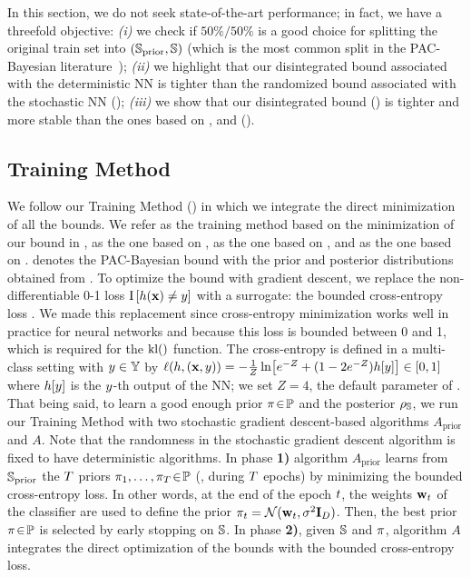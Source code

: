 In this section, we do not seek state-of-the-art performance; in fact, we have a threefold objective:
{\it (i)} we check if $50\%/50\%$ is a good choice for splitting the original train set into $(\S_{\text{prior}}, \S)$ (which is the most common split in the PAC-Bayesian literature~\citep{GermainLacasseLavioletteMarchand2009,PerezOrtizRivasplataShaweTaylorSzepesvari2021});
{\it (ii)} we highlight that our disintegrated bound associated with the deterministic NN is tighter than the randomized bound associated with the stochastic NN ();
{\it (iii)} we show that our disintegrated bound () is tighter and more stable than the ones based on \citet{RivasplataKuzborskijSzepesvariShaweTaylor2020}, \citet{BlanchardFleuret2007} and \citet{Catoni2007} ().

\subsection{Training Method}
We follow our Training Method () in which we integrate the direct minimization of all the bounds.
We refer as \algoours the training method based on the minimization of our bound in , as \algorivasplata the one based on , as \algoblanchard the one based on , and as \algocatoni the one based on .
\algostoNN denotes the PAC-Bayesian bound with the prior and posterior distributions obtained from \algoours.
To optimize the bound with gradient descent, we replace the non-differentiable 0-1 loss $\indic\LB \h(\x)\ne\y\RB$ with a surrogate: the bounded cross-entropy loss \citep{DziugaiteRoy2018}.
We made this replacement since cross-entropy minimization works well in practice for neural networks \citep{GoodfellowBengioCourville2016} and because this loss is bounded between 0 and 1, which is required for the $\kl()$ function.
The cross-entropy is defined in a multi-class setting with \mbox{$\y\in\Y$} by \mbox{$\loss(\h, (\x,\y)) = -\frac{1}{Z}\ln\!\LB e^{-Z}+(1-2e^{-Z})\h[y]\RB \in [0, 1]$} where $\h[y]$ is the \mbox{$\y$-th} output of the  NN; we set $Z{=}4$, the default parameter of \citet{DziugaiteRoy2018}.
That being said, to learn a good enough prior $\P\!\in\!\priorset$ and the posterior $\AQ$, we run our Training Method with two stochastic gradient descent-based algorithms $A_{\text{prior}}$ and $A$.
Note that the randomness in the stochastic gradient descent algorithm is fixed to have deterministic algorithms.
In phase {\bf 1)} algorithm $A_{\text{prior}}$ learns from $\S_{\text{prior}}$  the $\iter$ priors \mbox{$\P_1,\dots,\P_\iter\!\in\!\priorset$} (\ie, during $\iter$ epochs)  by minimizing the bounded cross-entropy loss.
In other words, at the end of the epoch $\t$, the weights $\wbf_\t$ of the classifier are used to define the prior $\P_\t=\Ncal(\wbf_\t, \sigma^2\Ibf_{D})$.
Then, the best prior $\P\!\in\!\priorset$ is selected by early stopping on $\S$.
In phase {\bf 2)}, given $\S$ and $\P$, 
algorithm $A$ integrates the direct optimization of the bounds with the bounded cross-entropy loss.
